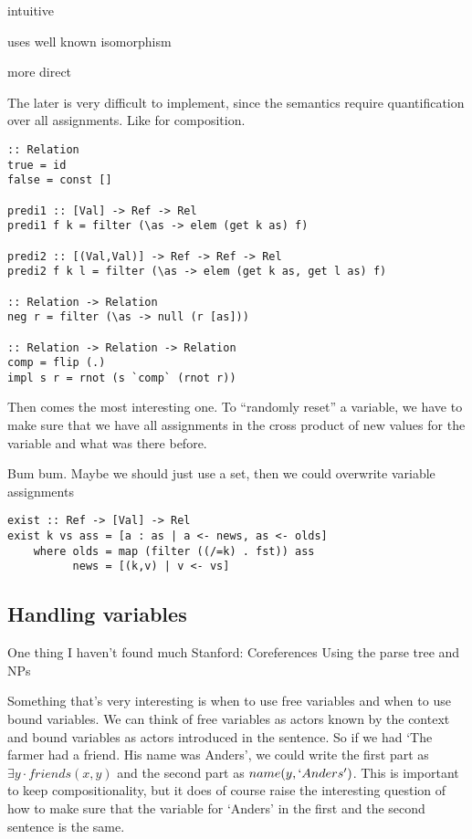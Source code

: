 \documentclass[12pt]{article}
\begin{document}
intuitive

uses well known isomorphism

more direct

The later is very difficult to implement, since the semantics require quantification over all assignments. Like for composition.

\begin{lstlisting}
:: Relation
true = id
false = const []

predi1 :: [Val] -> Ref -> Rel
predi1 f k = filter (\as -> elem (get k as) f)

predi2 :: [(Val,Val)] -> Ref -> Ref -> Rel
predi2 f k l = filter (\as -> elem (get k as, get l as) f)

:: Relation -> Relation
neg r = filter (\as -> null (r [as]))

:: Relation -> Relation -> Relation
comp = flip (.)
impl s r = rnot (s `comp` (rnot r))
\end{lstlisting}
Then comes the most interesting one. To ``randomly reset'' a variable, we have to make sure that we have all assignments in the cross product of new values for the variable and what was there before.

Bum bum. Maybe we should just use a set, then we could overwrite variable assignments
\begin{lstlisting}
exist :: Ref -> [Val] -> Rel
exist k vs ass = [a : as | a <- news, as <- olds]
	where olds = map (filter ((/=k) . fst)) ass
	      news = [(k,v) | v <- vs]
\end{lstlisting}

\subsection{Handling variables}
One thing I haven't found much \cite{visser1999donkey}
Stanford: \cite{lee2013deterministic}
\cite{lee2011stanford}
\cite{raghunathan2010multi}
Coreferences
Using the parse tree and NPs

Something that's very interesting is when to use free variables and when to use bound variables. We can think of free variables as actors known by the context and bound variables as actors introduced in the sentence. So if we had `The farmer had a friend. His name was Anders', we could write the first part as $\exists y \cdot friends(x,y)$ and the second part as $name(y, `Anders')$. This is important to keep compositionality, but it does of course raise the interesting question of how to make sure that the variable for `Anders' in the first and the second sentence is the same.
\end{document}
